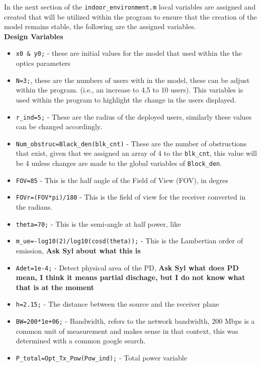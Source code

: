 In the next section of the \verb|indoor_environment.m| local variables are assigned and created that will be utilized within the program to ensure that the creation of the model remains stable, the following are the assigned variables. \\
\textbf{Design Variables}
\begin{itemize}
    \item \verb|x0 & y0;| - these are initial values for the model that used within the the optics parameters 
    \item \verb|N=3;|, these are the numbers of users with in the model, these can be adjust within the program. (i.e., an increase to 4,5 to 10 users). This variables is used within the program to highlight the change in the users displayed.
    \item \verb|r_ind=5;| - These are the radius of the deployed users, similarly these values can be changed accordingly.
    \item \verb|Num_obstruc=Black_den(blk_cnt)| - These are the number of obstructions that exist, given that we assigned an array of 4 to the \verb|blk_cnt|, this value will be 4 unless changes are made to the global variables of \verb|Block_den|.
    \item \verb|FOV=85| - This is the half angle of the Field of View (FOV), in degres
    \item \verb|FOVr=(FOV*pi)/180| - This is the field of view for the receiver converted in the radians.
    \item \verb|theta=70;| - This is the semi-angle at half power, like
    \item \verb|m_ue=-log10(2)/log10(cosd(theta));| - This is the Lambertian order of emission,  \textbf{Ask Syl about what this is}
    \item \verb|Adet=1e-4;| - Detect physical area of the PD, \textbf{Ask Syl what does PD mean, I think it means partial dischage, but I do not know what that is at the moment} %
    \item \verb|h=2.15;| - The distance between the source and the receiver plane
    \item \verb|BW=200*1e+06;| - Bandwidth, refers to the network bandwidth, 200 Mbps is a common unit of measurement and makes sense in that context, this was determined with a common google search.
    \item \verb|P_total=Opt_Tx_Pow(Pow_ind);| - Total power variable

\end{itemize}
